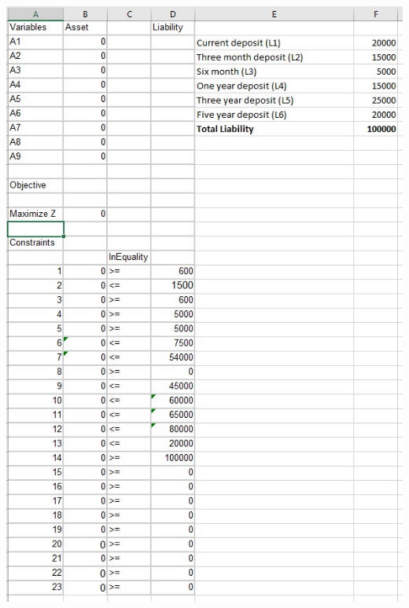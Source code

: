 				\begin{center}
				\includegraphics[width=\linewidth]{figures/LPP-Problem.jpg}	
				\label{fig: LPP Problem Formulation in Excel}
				\end{center}

